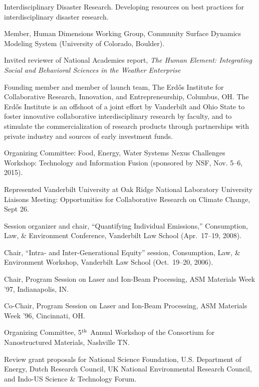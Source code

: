   Interdisciplinary Disaster Research.
  Developing resources on best practices for interdisciplinary disaster
  research.
\item[2017--2018] Member, Human Dimensions Working Group,
  Community Surface Dynamics Modeling System (University of Colorado, Boulder).
\item[2017] Invited reviewer of National Academies report,
  \emph{The Human Element: Integrating Social and Behavioral Sciences in the
    Weather Enterprise}
\item[2017] Founding member and member of launch team,
  The Erd\H{o}s Institute for Collaborative Research, Innovation, and
  Entrepreneurship, Columbus, OH.
  The Erd\H{o}s Institute is an offshoot of a joint effort by Vanderbilt and
  Ohio State to foster innovative collaborative interdisciplinary research by
  faculty, and to stimulate the commercialization of research products through
  partnerships with private industry and sources of early investment funds.
\item[2015] Organizing Committee:
  Food, Energy, Water Systems Nexus Challenges Workshop: Technology and
  Information Fusion (sponsored by NSF, Nov. 5--6, 2015).
\item[2007] Represented Vanderbilt University at Oak Ridge National Laboratory
  University Liaisons Meeting: Opportunities for Collaborative Research on
  Climate Change, Sept 26.
\item[2008] Session organizer and chair, ``Quantifying Individual Emissions,''
  Consumption, Law, \& Environment Conference, Vanderbilt Law School
  (Apr.\ 17--19, 2008).
\item[2006] Chair, ``Intra- and Inter-Generational Equity'' session,
  Consumption, Law, \& Environment Workshop, Vanderbilt Law School
  (Oct.~19--20, 2006).
\item[1997] Chair, Program Session on Laser and Ion-Beam Processing,
  ASM Materials Week '97, In\-di\-an\-a\-po\-lis, IN.
\item[1996] Co-Chair, Program Session on Laser and Ion-Beam Processing,
  ASM Materials Week '96, Cincinnati, OH.
\item[1996] Organizing Committee,
   5$^{\mbox{\scriptsize th}}$ Annual Workshop of the Consortium for
   Nanostructured Materials, Nashville TN.
\item[Ongoing] Review grant proposals for National Science Foundation,
  U.S. Department of Energy,
  Dutch Research Council,
  UK National Environmental Research Council,
  and Indo-US Science \& Technology Forum.
